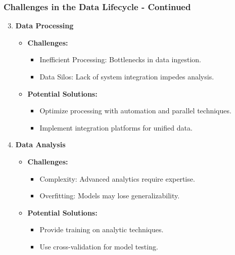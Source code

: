 \documentclass[aspectratio=169]{beamer}
\begin{document}
\begin{frame}[fragile]
  \frametitle{Challenges in the Data Lifecycle - Continued}

  \begin{enumerate}
    \setcounter{enumi}{2}
    
    \item \textbf{Data Processing}
      \begin{itemize}
        \item \textbf{Challenges:}
          \begin{itemize}
            \item Inefficient Processing: Bottlenecks in data ingestion.
            \item Data Silos: Lack of system integration impedes analysis.
          \end{itemize}
        \item \textbf{Potential Solutions:}
          \begin{itemize}
            \item Optimize processing with automation and parallel techniques.
            \item Implement integration platforms for unified data.
          \end{itemize}
      \end{itemize}

    \item \textbf{Data Analysis}
      \begin{itemize}
        \item \textbf{Challenges:}
          \begin{itemize}
            \item Complexity: Advanced analytics require expertise.
            \item Overfitting: Models may lose generalizability.
          \end{itemize}
        \item \textbf{Potential Solutions:}
          \begin{itemize}
            \item Provide training on analytic techniques.
            \item Use cross-validation for model testing.
          \end{itemize}
      \end{itemize}
  \end{enumerate}

\end{frame}
\end{document}
